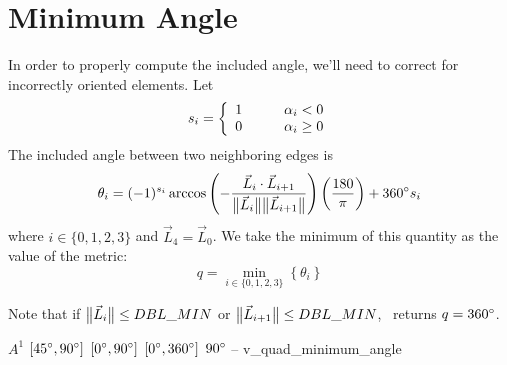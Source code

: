 \section{Minimum Angle}

In order to properly compute the included angle, we'll need to
correct for incorrectly oriented elements.
Let
\[
s_i = \left\{ \begin{array}{ll}
  1\rule{2em}{0pt} & \alpha_i < 0\\
  0                & \alpha_i \geq 0
  \end{array}\right.
\]
The included angle between two neighboring edges is
\[
\theta_i = (-1)^{s_i} \arccos{ \left( - \frac {\vec L_{i} \cdot \vec L_{i+1} }
                                {\big\lVert{\vec L_{i}}\big\rVert \big\lVert{\vec L_{i+1}}\big\rVert} \right) } 
                                  \left( \frac {180} {\pi} \right) 
           + 360^{\circ} s_i
\]
where $i\in\{0,1,2,3\}$ and $\vec L_4 = \vec L_0$.
We take the minimum of this quantity as the value of the metric:
\[
q = \min_{i\in\{0,1,2,3\}}\left\{ \theta_i \right\}
\]

Note that if $\big\lVert{\vec L_i}\big\rVert \leq DBL\_MIN$ or $\big\lVert{\vec L_{i+1}}\big\rVert \leq DBL\_MIN$,
\verd\ returns $q = 360^{\circ}$.

%
{$A^1$}%
{$[45^{\circ},90^{\circ}]$}%
{$[0^{\circ},90^{\circ}]$}%
{$[0^{\circ},360^{\circ}]$}%
{$90^{\circ}$}%
{--}%
{v\_quad\_minimum\_angle}%

